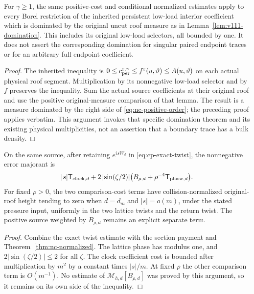 \begin{corollary}
\label{cor:nc-low-source}
For $\gamma\ge1$, the same positive-cost and conditional normalized
estimates apply to every Borel restriction of the inherited
persistent low-load interior coefficient which is dominated by the
original uncut roof measure as in Lemma~\ref{lem:v111-domination}.
This includes its original low-load selectors, all bounded by one.
It does not assert the corresponding domination for singular paired
endpoint traces or for an arbitrary full endpoint coefficient.
\end{corollary}
\begin{proof}
The inherited inequality is
$0\le c_{\rm per}^{\varepsilon,\gamma}
       \le f^\varepsilon(u,\vartheta)\le A(u,\vartheta)$
on each actual physical roof segment.  Multiplication by its
nonnegative low-load selector and by $f$ preserves the inequality.
Sum the actual source coefficients at their original roof and use
the positive original-measure comparison of that lemma.  The
result is a measure dominated by the right side of
\eqref{eq:nc-positive-order}; the preceding proof applies verbatim.
This argument invokes that specific domination theorem and its
existing physical multiplicities, not an assertion that a boundary
trace has a bulk density.
\end{proof}

\begin{corollary}
\label{cor:nc-fourier}
On the same source, after retaining $e^{isW_d}$ in
\eqref{eq:cp-exact-twist}, the nonnegative error majorant is
\[
 |s|\mathsf T_{{\rm clock},d}
 +2|\sin(\zeta/2)|
       \bigl(B_{\rho,d}+\rho^{-4}\mathsf T_{{\rm phase},d}\bigr).
\]
For fixed $\rho>0$, the two comparison-cost terms have
collision-normalized original-roof height tending to zero when
$d=d_m$ and $|s|=o(m)$, under the stated pressure input, uniformly
in the two lattice twists and the return twist.  The positive source
weighted by $B_{\rho,d}$ remains an explicit separate term.
\end{corollary}
\begin{proof}
Combine the exact twist estimate with the section payment and
Theorem~\ref{thm:nc-normalized}.  The lattice phase has modulus one,
and $2|\sin(\zeta/2)|\le2$ for all $\zeta$.  The clock coefficient
cost is bounded after multiplication by $m^2$ by a constant times
$|s|/m$.  At fixed $\rho$ the other comparison term is $O(m^{-1})$.
No estimate of $\mathcal M_{h,d}[B_{\rho,d}]$ was proved by this
argument, so it remains on its own side of the inequality.
\end{proof}

